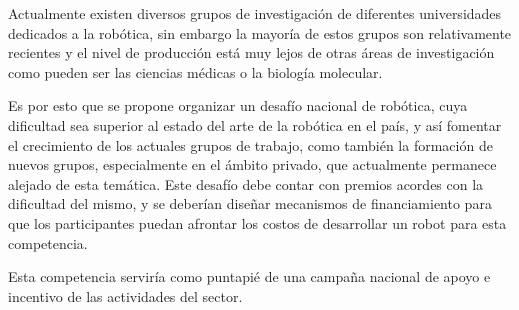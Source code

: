\documentclass[a4paper,12pt]{article}
\begin{document}
Actualmente existen diversos grupos de investigación de diferentes universidades dedicados a la robótica, sin embargo la mayoría de estos grupos son relativamente recientes y el nivel de producción está muy lejos de otras áreas de investigación como pueden ser las ciencias médicas o la biología molecular.

Es por esto que se propone organizar un desafío nacional de robótica, cuya dificultad sea superior al estado del arte de la robótica en el país, y así fomentar el crecimiento de los actuales grupos de trabajo, como también la formación de nuevos grupos, especialmente en el ámbito privado, que actualmente permanece alejado de esta temática. Este desafío debe contar con premios acordes con la dificultad del mismo, y se deberían diseñar mecanismos de financiamiento para que los participantes puedan afrontar los costos de desarrollar un robot para esta competencia.

Esta competencia serviría como puntapié de una campaña nacional de apoyo e incentivo de las actividades del sector.
\end{document}
